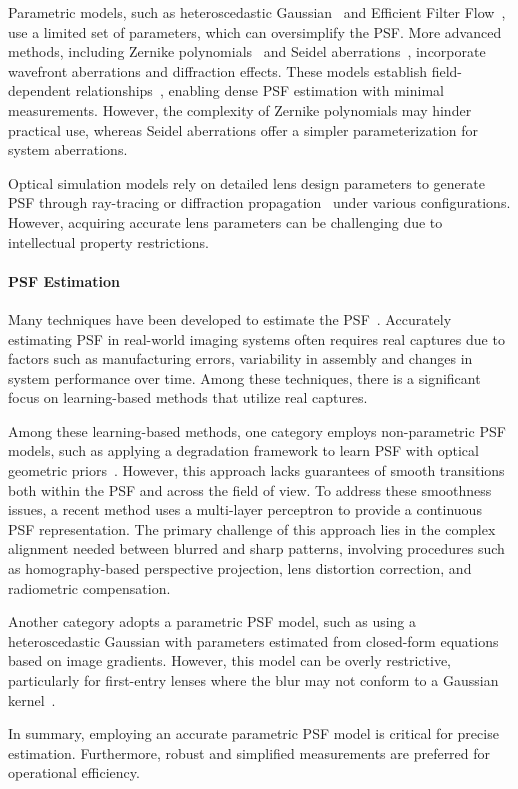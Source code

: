 Parametric models, such as heteroscedastic Gaussian~\cite{delbracio2021polyblur,eboli2022fast} and Efficient Filter Flow~\cite{schuler2012blind}, use a limited set of parameters, which can oversimplify the PSF. More advanced methods, including Zernike polynomials~\cite{niu2022zernike} and Seidel aberrations~\cite{zhou2024revealing}, incorporate wavefront aberrations and diffraction effects. These models establish field-dependent relationships~\cite{gray2012analytic,zhou2024revealing}, enabling dense PSF estimation with minimal measurements. However, the complexity of Zernike polynomials may hinder practical use, whereas Seidel aberrations offer a simpler parameterization for system aberrations.

Optical simulation models rely on detailed lens design parameters to generate PSF through ray-tracing or diffraction propagation~\cite{baker2003mathematical} under various configurations. However, acquiring accurate lens parameters can be challenging due to intellectual property restrictions.

\paragraph{PSF Estimation}
Many techniques have been developed to estimate the PSF~\cite{jemec20172d,lin2023learning,liang2021mutual,liaudat2023rethinking,eboli2022fast,chen2021extreme,chen2022computational,qiao2024deep,shih2012image,mosleh2015camera,kee2011modeling}. Accurately estimating PSF in real-world imaging systems often requires real captures due to factors such as manufacturing errors, variability in assembly and changes in system performance over time. Among these techniques, there is a significant focus on learning-based methods that utilize real captures. 

Among these learning-based methods, one category employs non-parametric PSF models, such as applying a degradation framework to learn PSF with optical geometric priors~\cite{chen2021extreme}. However, this approach lacks guarantees of smooth transitions both within the PSF and across the field of view. To address these smoothness issues, a recent method uses a multi-layer perceptron to provide a continuous PSF representation\cite{lin2023learning}. The primary challenge of this approach lies in the complex alignment needed between blurred and sharp patterns, involving procedures such as homography-based perspective projection, lens distortion correction, and radiometric compensation.

Another category adopts a parametric PSF model, such as using a heteroscedastic Gaussian with parameters estimated from closed-form equations based on image gradients. However, this model can be overly restrictive, particularly for first-entry lenses where the blur may not conform to a Gaussian kernel~\cite{eboli2022fast}.

In summary, employing an accurate parametric PSF model is critical for precise estimation. Furthermore, robust and simplified measurements are preferred for operational efficiency. 

